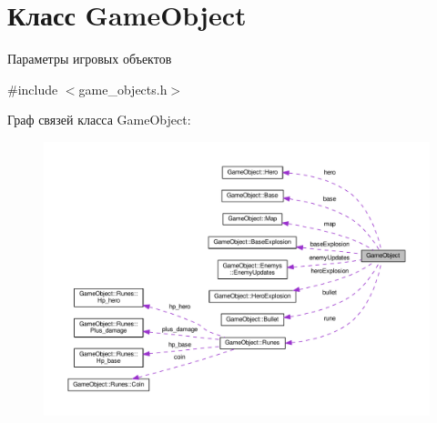 \hypertarget{classGameObject}{}\section{Класс Game\+Object}
\label{classGameObject}


Параметры игровых объектов  




{\ttfamily \#include $<$game\+\_\+objects.\+h$>$}



Граф связей класса Game\+Object\+:\nopagebreak
\begin{figure}[H]
\begin{center}
\leavevmode
\includegraphics[width=350pt]{classGameObject__coll__graph}
\end{center}
\end{figure}
